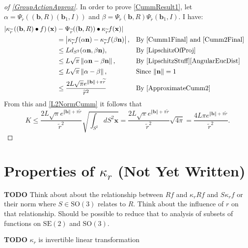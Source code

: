 \documentclass[a4paper,11pt]{scrartcl}
\numberwithin{dummy}{section}
\theoremstyle{plain}
\theoremstyle{plain}
\theoremstyle{plain}
\theoremstyle{plain}
\theoremstyle{nonumberplain}
\newtheorem{proof}{Proof}
\newcommand{\Ltwonorm}[1]{\left\Vert #1 \right\Vert} %
\newcommand{\SE}{\mathrm{SE}}
\newcommand{\SO}{\mathrm{SO}}
\begin{document}
\begin{proof}[of \cref{GroupActionApprox}]
		In order to prove \eqref{CummResult1}, let $ \alpha = \Psi_{\widetilde{r}} ((\mathbf{b}, R) (\mathbf{b}_{1}, I) ) $ and $ \beta = \Psi_{\widetilde{r}} (\mathbf{b}, R) \Psi_{\widetilde{r}} (\mathbf{b}_{1}, I) $. I have:
		\begin{align*}
		| \kappa_{\widetilde{r}} \left( (\mathbf{b}, R) \bullet f \right) (\mathbf{x}) &- \Psi_{\widetilde{r}} ((\mathbf{b}, R)) \bullet \kappa_{\widetilde{r}} f (\mathbf{x}) |\\
		&= \left| \kappa_{\widetilde{r}} f (\alpha \mathbf{n}) - \kappa_{\widetilde{r}} f (\beta \mathbf{n}) \right|, && \mbox{By \eqref{Cumm1Final} and \eqref{Cumm2Final}} \\
		&\le L d_{S^{2}} (\alpha \mathbf{n}, \beta \mathbf{n}), && \mbox{By \eqref{LipschitzOfProj}} \\
		&\le L \sqrt{\pi} \Ltwonorm{\alpha \mathbf{n} - \beta \mathbf{n}}, && \mbox{By \cref{LipschitzStuff}\ref{AngularEucDist}} \\
		&\le L \sqrt{\pi} \Ltwonorm{\alpha - \beta}, && \mbox{Since $ \Ltwonorm{\mathbf{n}} = 1 $} \\
		&\le \frac{2 L \sqrt{\pi} e^{\Ltwonorm{\mathbf{b}} + \pi \widetilde{r}}}{\widetilde{r}^{2}}  && \mbox{By \cref{ApproximateCumm2}}
		\end{align*}
		From this and \eqref{L2NormCumm} it follows that
		\begin{equation*}
		K
		\le \frac{2 L \sqrt{\pi} e^{\Ltwonorm{\mathbf{b}} + \pi \widetilde{r}}}{\widetilde{r}^{2}} \sqrt{\int_{S^{2}} dS^{2} \mathbf{x}}
		= \frac{2 L \sqrt{\pi} e^{\Ltwonorm{\mathbf{b}} + \pi \widetilde{r}}}{\widetilde{r}^{2}} \sqrt{4 \pi }
		= \frac{4 L \pi e^{\Ltwonorm{\mathbf{b}} + \pi \widetilde{r}}}{\widetilde{r}^{2}}.
		\end{equation*}
	\end{proof}
	
	
	\section{Properties of $ \kappa_{r} $ (Not Yet Written)}
	\textbf{TODO} Think about about the relationship between $ R f $ and $ \kappa_{r} R f $ and $ S \kappa_{r} f $ or their norm  where $ S \in \SO(3) $ relates to $ R $. Think about the influence of $ r $ on that relationship. Should be possible to reduce that to analysis of subsets of functions on $ \SE(2) $ and $ \SO(3) $.
	
	\textbf{TODO} $ \kappa_{r}  $ is invertible linear transformation
	
\end{document}
